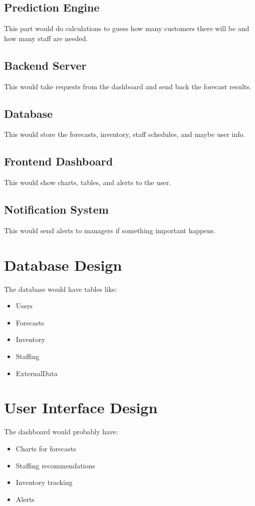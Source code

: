 \documentclass[12pt]{report}
\begin{document}
\subsection{Prediction Engine}
This part would do calculations to guess how many customers there will be and how many staff are needed.

\subsection{Backend Server}
This would take requests from the dashboard and send back the forecast results.

\subsection{Database}
This would store the forecasts, inventory, staff schedules, and maybe user info.

\subsection{Frontend Dashboard}
This would show charts, tables, and alerts to the user.

\subsection{Notification System}
This would send alerts to managers if something important happens.


\section{Database Design}

The database would have tables like:
\begin{itemize}
    \item Users
    \item Forecasts
    \item Inventory
    \item Staffing
    \item ExternalData
\end{itemize}

\section{User Interface Design}

The dashboard would probably have:
\begin{itemize}
    \item Charts for forecasts
    \item Staffing recommendations
    \item Inventory tracking
    \item Alerts
\end{itemize}
\end{document}
